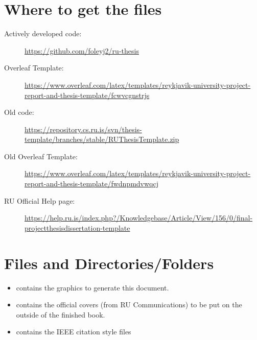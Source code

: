 \section{Where to get the files}
\begin{description}
\item [Actively developed code:] \url{https://github.com/foleyj2/ru-thesis}\item [Overleaf Template:]  \url{https://www.overleaf.com/latex/templates/reykjavik-university-project-report-and-thesis-template/fcwvcgnstrjs}
\item [Old code:] \url{https://repository.cs.ru.is/svn/thesis-template/branches/stable/RUThesisTemplate.zip}
\item [Old Overleaf Template:]
\url{https://www.overleaf.com/latex/templates/reykjavik-university-project-report-and-thesis-template/fwdnpmdvwqcj}
\item [RU Official Help page:]
\url{https://help.ru.is/index.php?/Knowledgebase/Article/View/156/0/final-projectthesisdissertation-template}
\end{description}


\section{Files and Directories/Folders}
\begin{itemize}
\item {} contains the graphics to generate this document.
\item {} contains the official covers (from RU Communications) to be put on the outside of the finished book.
\item {} contains the IEEE citation style files
\end{itemize}


